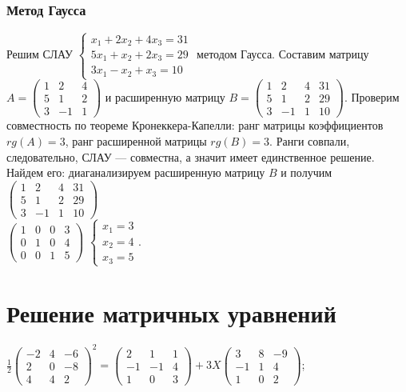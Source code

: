 \documentclass[14pt]{extreport}
\begin{document}
\subsubsection{Метод Гаусса}

Решим СЛАУ $\begin{cases}x_1 + 2x_2 + 4x_3 = 31\\ 5x_1 + x_2 + 2x_3 = 29\\ 3x_1 - x_2 + x_3 = 10\end{cases}$
методом Гаусса. Составим матрицу $A = \begin{pmatrix}1&2&4\\5&1&2\\3&-1&1\end{pmatrix}$ и
расширенную матрицу $B = \begin{pmatrix}1&2&4&31\\5&1&2&29\\3&-1&1&10\end{pmatrix}$.
Проверим совместность по теореме Кронеккера-Капелли: ранг матрицы коэффициентов $rg{(A)} =
3$, ранг расширенной матрицы $rg{(B)} = 3$. Ранги совпали, следовательно, СЛАУ --- совместна, а значит
имеет единственное решение. Найдем его: диаганализируем расширенную матрицу $B$ и получим
$\begin{pmatrix}1&2&4&31\\5&1&2&29\\3&-1&1&10\end{pmatrix}$ \Rightarrow\\
$\begin{pmatrix}1&0&0&3\\0&1&0&4\\0&0&1&5\end{pmatrix}$ \Rightarrow
$\begin{cases}x_1 = 3\\x_2 = 4\\x_3 = 5\end{cases}$.


\section{Решение матричных уравнений}

$\frac{1}{2}\begin{pmatrix}-2&4&-6\\2&0&-8\\4&4&2\end{pmatrix}^2 = \begin{pmatrix}2&1&1\\-1&-1&4\\1&0&3
\end{pmatrix} + 3X\begin{pmatrix}3&8&-9\\-1&1&4\\1&0&2\end{pmatrix}$;
\end{document}
